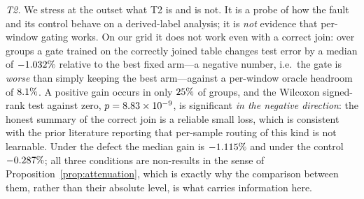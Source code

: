 \documentclass[a4paper,fleqn]{cas-sc}
\begin{document}
\emph{T2.} We stress at the outset what T2 is and is not. It is a probe of how the
fault and its control behave on a derived-label analysis; it is \emph{not} evidence
that per-window gating works. On our grid it does not work even with a correct
join: over \NumTaskTwoBlocks{} groups a gate trained on the correctly joined table
changes test error by a median of $-1.032\%$ relative to the
best fixed arm---a negative number, i.e.\ the gate is \emph{worse} than simply
keeping the best arm---against a per-window oracle headroom of
$8.1\%$. A positive gain occurs in only
$25\%$ of groups, and the Wilcoxon signed-rank test
against zero, $p = 8.83\times 10^{-9}{}$, is significant \emph{in the negative
direction}: the honest summary of the correct join is a reliable small loss, which
is consistent with the prior literature reporting that per-sample routing of this
kind is not learnable. Under the defect the median gain is
$-1.115\%$ and under the control
$-0.287\%$; all three conditions are non-results in the sense
of Proposition~\ref{prop:attenuation}, which is exactly why the comparison between
them, rather than their absolute level, is what carries information here.
\end{document}
